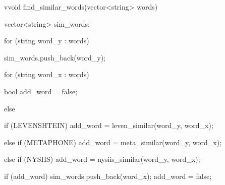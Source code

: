 \begin{adjustbox}{width=\textwidth,keepaspectratio}
\begin{Code}[CppStyle]
vvoid find_similar_words(vector<string> words)
{
    vector<string> sim_words;

    for (string word_y : words)
    {
        sim_words.push_back(word_y);

        for (string word_x : words)
        {
            bool add_word = false;

            else
            {
                if (LEVENSHTEIN) add_word = 
                    leven_similar(word_y, word_x);

                else if (METAPHONE) add_word = 
                    meta_similar(word_y, word_x);

                else if (NYSIIS) add_word = 
                    nysiis_similar(word_y, word_x);
            }
            
            if (add_word)
            {
                sim_words.push_back(word_x);
                add_word = false;
            }
        }
    }
}
\end{Code}
\end{adjustbox}